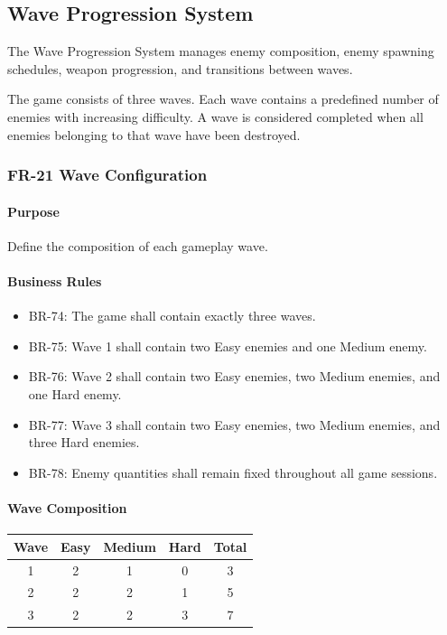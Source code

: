 \documentclass[11pt,a4paper]{article}
\begin{document}
\subsection{Wave Progression System}

The Wave Progression System manages enemy composition, enemy spawning schedules,
weapon progression, and transitions between waves.

The game consists of three waves. Each wave contains a predefined number of
enemies with increasing difficulty. A wave is considered completed when all
enemies belonging to that wave have been destroyed.

\subsubsection{FR-21 Wave Configuration}

\paragraph{Purpose}
Define the composition of each gameplay wave.

\paragraph{Business Rules}
\begin{itemize}
  \item BR-74: The game shall contain exactly three waves.
  \item BR-75: Wave 1 shall contain two Easy enemies and one Medium enemy.
  \item BR-76: Wave 2 shall contain two Easy enemies, two Medium enemies, and one
        Hard enemy.
  \item BR-77: Wave 3 shall contain two Easy enemies, two Medium enemies, and
        three Hard enemies.
  \item BR-78: Enemy quantities shall remain fixed throughout all game sessions.
\end{itemize}

\paragraph{Wave Composition}
\begin{center}
\begin{tabular}{ccccc}
  \toprule
  \textbf{Wave} & \textbf{Easy} & \textbf{Medium} & \textbf{Hard} & \textbf{Total} \\
  \midrule
  1 & 2 & 1 & 0 & 3 \\
  2 & 2 & 2 & 1 & 5 \\
  3 & 2 & 2 & 3 & 7 \\
  \bottomrule
\end{tabular}
\end{center}
\end{document}

